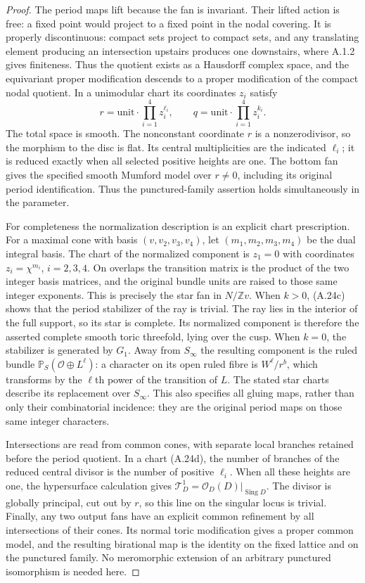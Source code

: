 \begin{proof}
The period maps lift because the fan is invariant. Their
lifted action is free: a fixed point would project to a fixed
point in the nodal covering. It is properly discontinuous:
compact sets project to compact sets, and any translating
element producing an intersection upstairs produces one
downstairs, where A.1.2 gives finiteness. Thus the quotient
exists as a Hausdorff complex space, and the equivariant
proper modification descends to a proper modification of
the compact nodal quotient. In a unimodular chart its
coordinates $z_i$ satisfy
\[
 r=\text{unit}\cdot\prod_{i=1}^4 z_i^{\ell_i},
 \qquad q=\text{unit}\cdot\prod_{i=1}^4 z_i^{k_i}.
 \tag{A.24d}
\]
The total space is smooth. The nonconstant coordinate $r$
is a nonzerodivisor, so the morphism to the disc is flat.
Its central multiplicities are the indicated $\ell_i$;
it is reduced exactly when all selected positive heights
are one. The bottom fan gives the specified smooth
Mumford model over $r\ne0$, including its original period
identification. Thus the punctured-family assertion holds
simultaneously in the parameter.

For completeness the normalization description is an
explicit chart prescription. For a maximal cone with basis
$(v,v_2,v_3,v_4)$, let $(m_1,m_2,m_3,m_4)$ be the dual
integral basis. The chart of the normalized component is
$z_1=0$ with coordinates $z_i=\chi^{m_i}$, $i=2,3,4$.
On overlaps the transition matrix is the product of the two
integer basis matrices, and the original bundle units are
raised to those same integer exponents. This is precisely
the star fan in $N/\mathbb Zv$. When $k>0$, (A.24c) shows
that the period stabilizer of the ray is trivial. The ray
lies in the interior of the full support, so its star is
complete. Its normalized component is therefore the
asserted complete smooth toric threefold, lying over the
cusp. When $k=0$, the stabilizer is generated by $G_1$.
Away from $S_\infty$ the resulting component is the ruled
bundle $\mathbb P_S(\mathcal O\oplus L^\ell)$: a character
on its open ruled fibre is $W^\ell/r^b$, which transforms
by the $\ell$th power of the transition of $L$. The stated
star charts describe its replacement over $S_\infty$.
This also specifies all gluing maps, rather than only their
combinatorial incidence: they are the original period maps
on those same integer characters.

Intersections are read from common cones, with separate
local branches retained before the period quotient. In a
chart (A.24d), the number of branches of the reduced
central divisor is the number of positive $\ell_i$.
When all these heights are one, the hypersurface
calculation gives
$\mathcal T^1_D=\mathcal O_D(D)|_{\operatorname{Sing}D}$.
The divisor is globally principal, cut out by $r$, so this
line on the singular locus is trivial. Finally, any two
output fans have an explicit common refinement by all
intersections of their cones. Its normal toric modification
gives a proper common model, and the resulting birational
map is the identity on the fixed lattice and on the
punctured family. No meromorphic extension of an arbitrary
punctured isomorphism is needed here.
\end{proof}


